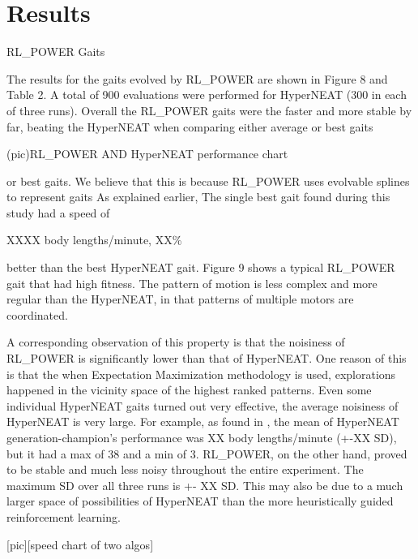 \section{Results}

RL\_POWER Gaits

The results for the gaits evolved by RL\_POWER are shown in Figure 8
and Table 2. A total of 900 evaluations were performed for HyperNEAT
(300 in each of three runs). Overall the RL\_POWER gaits were the
faster and more stable by far, beating the HyperNEAT when comparing
either average or best gaits

(pic)RL\_POWER AND HyperNEAT performance chart


or best gaits. We believe that this is because RL\_POWER uses evolvable splines to represent gaits As explained earlier,  
The single best gait found during this study had a speed of

XXXX body lengths/minute, XX\%

better than the best HyperNEAT gait. Figure 9 shows a typical
RL\_POWER gait that had high fitness. The pattern of motion is less
complex and more regular than the HyperNEAT, in that patterns of
multiple motors are coordinated.

A corresponding observation of this property is that the noisiness of
RL\_POWER is significantly lower than that of HyperNEAT. One reason of
this is that the when Expectation Maximization methodology is used,
explorations happened in the vicinity space of the highest ranked
patterns. Even some individual HyperNEAT gaits turned out very
effective, the average noisiness of HyperNEAT is very large. For
example, as found in \cite{yosinski2011evolving-robot-gaits}, the mean of HyperNEAT generation-champion’s
performance was XX body lengths/minute (+-XX SD), but it had a max of
38 and a min of 3. RL\_POWER, on the other hand, proved to be stable
and much less noisy throughout the entire experiment. The maximum SD
over all three runs is +- XX SD. This may also be due to a much larger
space of possibilities of HyperNEAT than the more heuristically guided
reinforcement learning.

[pic][speed chart of two algos]



